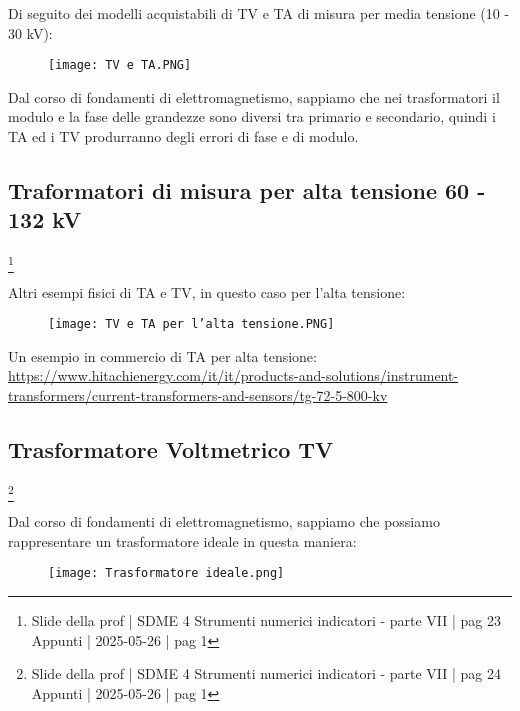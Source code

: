 Di seguito dei modelli acquistabili di TV e TA di misura per media tensione (10 - 30 kV): 

\begin{figure}[h]
    \centering
    \texttt{[image: TV e TA.PNG]}
\end{figure}

Dal corso di fondamenti di elettromagnetismo, sappiamo che nei trasformatori il modulo e la fase delle grandezze sono diversi tra primario e secondario, 
quindi i TA ed i TV produrranno degli errori di fase e di modulo. \newline 

\newpage 

\subsection{Traformatori di misura per alta tensione 60 - 132 kV}
\footnote{Slide della prof | SDME 4 Strumenti numerici indicatori - parte VII | pag 23\\  
Appunti | 2025-05-26 | pag 1}

Altri esempi fisici di TA e TV, in questo caso per l'alta tensione: 

\begin{figure}[h]
    \centering
    \texttt{[image: TV e TA per l'alta tensione.PNG]}
\end{figure}

\begin{tcolorbox}
Un esempio in commercio di TA per alta tensione:\\
\url{https://www.hitachienergy.com/it/it/products-and-solutions/instrument-transformers/current-transformers-and-sensors/tg-72-5-800-kv}     
\end{tcolorbox}


\newpage 

\subsection{Trasformatore Voltmetrico TV}
\footnote{Slide della prof | SDME 4 Strumenti numerici indicatori - parte VII | pag 24\\  
Appunti | 2025-05-26 | pag 1}

Dal corso di fondamenti di elettromagnetismo, sappiamo che possiamo rappresentare un trasformatore ideale in questa maniera: 

\begin{figure}[h]
    \centering
    \texttt{[image: Trasformatore ideale.png]}
\end{figure}


